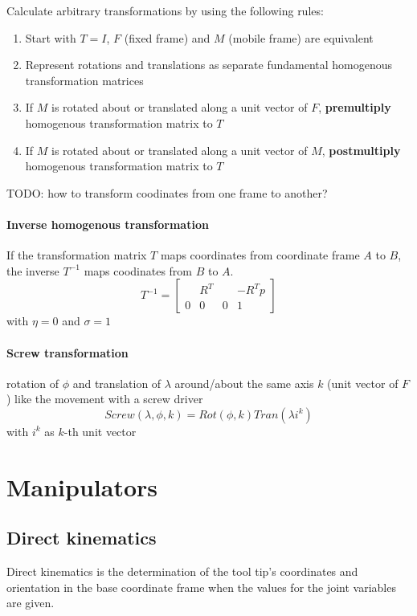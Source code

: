 \documentclass{article}
\begin{document}
	Calculate arbitrary transformations by using the following rules:
	\begin{enumerate}
		\item Start with $T = I$, $F$ (fixed frame) and $M$ (mobile frame) are equivalent
		\item Represent rotations and translations as separate fundamental homogenous transformation matrices
		\item If $M$ is rotated about or translated along a unit vector of $F$, \textbf{premultiply} homogenous transformation matrix to $T$
		\item If $M$ is rotated about or translated along a unit vector of $M$, \textbf{postmultiply} homogenous transformation matrix to $T$
	\end{enumerate}

	TODO: how to transform coodinates from one frame to another?
	
	\paragraph{Inverse homogenous transformation} If the transformation matrix $T$ maps coordinates from coordinate frame $A$ to $B$, the inverse $T^{-1}$ maps coodinates from $B$ to $A$.
	\begin{equation}
	T^{-1} = 
	\begin{bmatrix}
	& R^T & & -R^T p\\
	0 & 0 & 0 & 1
	\end{bmatrix}
	\end{equation}
	with $\eta = 0$ and $\sigma = 1$
	
	\paragraph{Screw transformation} rotation of $\phi$ and translation of $\lambda$ around/about the same axis $k$ (unit vector of $F$) like the movement with a screw driver
	\begin{equation}
	Screw(\lambda,\phi,k) = Rot(\phi , k) Tran(\lambda i^k)
	\end{equation}
	with $i^k$ as $k$-th unit vector
	
	\section{Manipulators}
	\subsection{Direct kinematics}
	Direct kinematics is the determination of the tool tip's coordinates and orientation in the base coordinate frame when the values for the joint variables are given.
\end{document}
